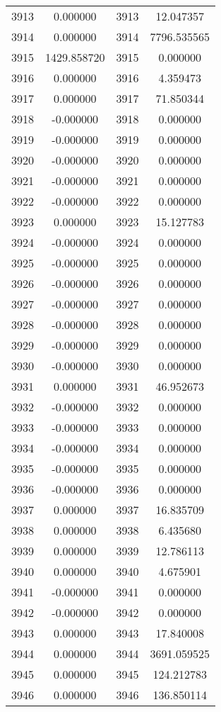 \documentclass[12pt]{article}
\begin{document}
\begin{longtable}{@{}cccc@{}}
3913 & 0.000000 & 3913 & 12.047357 \\
3914 & 0.000000 & 3914 & 7796.535565 \\
3915 & 1429.858720 & 3915 & 0.000000 \\
3916 & 0.000000 & 3916 & 4.359473 \\
3917 & 0.000000 & 3917 & 71.850344 \\
3918 & -0.000000 & 3918 & 0.000000 \\
3919 & -0.000000 & 3919 & 0.000000 \\
3920 & -0.000000 & 3920 & 0.000000 \\
3921 & -0.000000 & 3921 & 0.000000 \\
3922 & -0.000000 & 3922 & 0.000000 \\
3923 & 0.000000 & 3923 & 15.127783 \\
3924 & -0.000000 & 3924 & 0.000000 \\
3925 & -0.000000 & 3925 & 0.000000 \\
3926 & -0.000000 & 3926 & 0.000000 \\
3927 & -0.000000 & 3927 & 0.000000 \\
3928 & -0.000000 & 3928 & 0.000000 \\
3929 & -0.000000 & 3929 & 0.000000 \\
3930 & -0.000000 & 3930 & 0.000000 \\
3931 & 0.000000 & 3931 & 46.952673 \\
3932 & -0.000000 & 3932 & 0.000000 \\
3933 & -0.000000 & 3933 & 0.000000 \\
3934 & -0.000000 & 3934 & 0.000000 \\
3935 & -0.000000 & 3935 & 0.000000 \\
3936 & -0.000000 & 3936 & 0.000000 \\
3937 & 0.000000 & 3937 & 16.835709 \\
3938 & 0.000000 & 3938 & 6.435680 \\
3939 & 0.000000 & 3939 & 12.786113 \\
3940 & 0.000000 & 3940 & 4.675901 \\
3941 & -0.000000 & 3941 & 0.000000 \\
3942 & -0.000000 & 3942 & 0.000000 \\
3943 & 0.000000 & 3943 & 17.840008 \\
3944 & 0.000000 & 3944 & 3691.059525 \\
3945 & 0.000000 & 3945 & 124.212783 \\
3946 & 0.000000 & 3946 & 136.850114 \\

\end{longtable}
\end{document}
